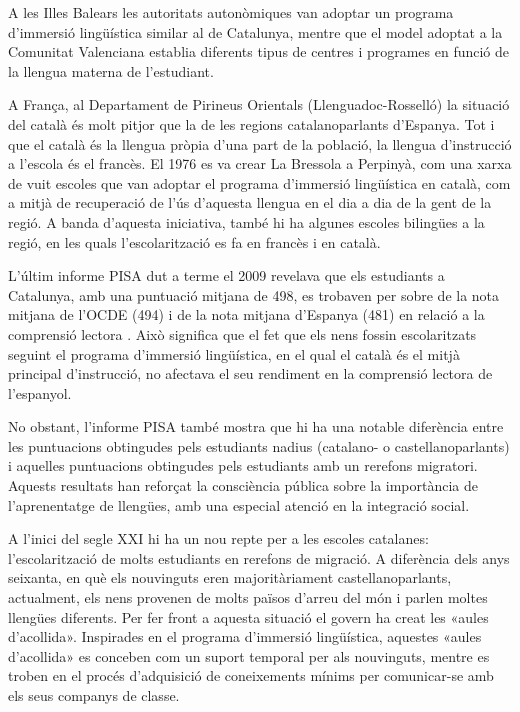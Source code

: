 \begin{multicols}{2}
A les Illes Balears les autoritats autonòmiques van adoptar un programa d’immersió lingüística similar al de Catalunya, mentre que el model adoptat a la Comunitat Valenciana establia diferents tipus de centres i programes en funció de la llengua materna de l’estudiant.

A França, al Departament de Pirineus Orientals (Llenguadoc-Rosselló) la situació del català és molt pitjor que la de les regions catalanoparlants d’Espanya. Tot i que el català és la llengua pròpia d’una part de la població, la llengua d’instrucció a l’escola és el francès. El 1976 es va crear La Bressola \cite{CAT-Nota6} a Perpinyà, com una xarxa de vuit escoles que van adoptar el programa d’immersió lingüística en català, com a mitjà de recuperació de l’ús d’aquesta llengua en el dia a dia de la gent de la regió. A banda d’aquesta iniciativa, també hi ha algunes escoles bilingües a la regió, en les quals l’escolarització es fa en francès i en català.

L’últim informe PISA dut a terme el 2009 revelava que els estudiants a Catalunya, amb una puntuació mitjana de 498, es trobaven per sobre de la nota mitjana de l’OCDE (494) i de la nota mitjana d’Espanya (481) en relació a la comprensió lectora \cite{CAT-Nota7}. Això significa que el fet que els nens fossin escolaritzats seguint el programa d’immersió lingüística, en el qual el català és el mitjà principal d’instrucció, no afectava el seu rendiment en la comprensió lectora de l’espanyol.

No obstant, l’informe PISA també mostra que hi ha una notable diferència entre les puntuacions obtingudes pels estudiants nadius (catalano- o castellanoparlants) i aquelles puntuacions obtingudes pels estudiants amb un rerefons migratori. Aquests resultats han reforçat la consciència pública sobre la importància de l’aprenentatge de llengües, amb una especial atenció en la integració social. 

A l’inici del segle XXI hi ha un nou repte per a les escoles catalanes: l’escolarització de molts estudiants en rerefons de migració. A diferència dels anys seixanta, en què els nouvinguts eren majoritàriament castellanoparlants, actualment, els nens provenen de molts països d’arreu del món i parlen moltes llengües diferents. Per fer front a aquesta situació el govern ha creat les «aules d’acollida». Inspirades en el programa d’immersió lingüística, aquestes «aules d’acollida» es conceben com un suport temporal per als nouvinguts, mentre es troben en el procés d’adquisició de coneixements mínims per comunicar-se amb els seus companys de classe.


\end{multicols}
